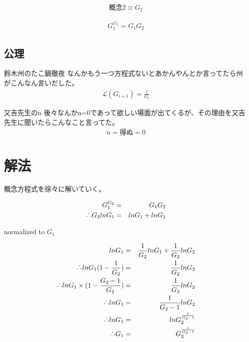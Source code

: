 \begin{eqnarray}
{概念2}\equiv G_{2}
\end{eqnarray}

\begin{eqnarray}
G_{1}^{G_{2}}=G_{1}G_{2}
\end{eqnarray}

\subsection{公理}
\begin{itembox}[c]{鈴木州のたこ鍋徹夜}
なんかもう一つ方程式ないとあかんやんとか言ってたら州がこんなん言いだした。
\begin{eqnarray}
\mathcal{L}(G_{i+1})=\frac{1}{G_{i}}
\end{eqnarray}
\end{itembox}

\begin{itembox}[c]{又吉先生のn}
後々なんかn=0であって欲しい場面が出てくるが、その理由を又吉先生に聞いたらこんなこと言ってた。
\begin{eqnarray}
n = 得ぬ = 0
\end{eqnarray}
\end{itembox}

\section{解法}
概念方程式を徐々に解いていく。

\begin{eqnarray}
G_{1}^{G_{2}}&=&G_{1}G_{2}\\
\raisebox{.2ex}{.}\raisebox{1.2ex}{.}\raisebox{.2ex}{.}  G_{2}ln{G_{1}}&=&ln{G_{1}}+ln{G_{2}}\\
\end{eqnarray}

normalized to $G_{1}$

\begin{eqnarray}
ln{G_{1}}&=&\frac{1}{G_{2}}ln{G_{1}}+\frac{1}{G_{2}}ln{G_{2}}\\
\raisebox{.2ex}{.}\raisebox{1.2ex}{.}\raisebox{.2ex}{.} ln{G_{1}}(1-\frac{1}{G_{2}})&=&\frac{1}{G_{2}}ln{G_{2}}\\
\raisebox{.2ex}{.}\raisebox{1.2ex}{.}\raisebox{.2ex}{.} ln{G_{1}}\times (1-\frac{G_{2}-1}{G_{2}})&=&\frac{1}{G_{2}}ln{G_{2}}\\
\raisebox{.2ex}{.}\raisebox{1.2ex}{.}\raisebox{.2ex}{.} ln{G_{1}}&=&\frac{1}{G_{2}-1}ln{G_{2}}\\
\raisebox{.2ex}{.}\raisebox{1.2ex}{.}\raisebox{.2ex}{.} ln{G_{1}}&=&ln{G_{2}^{\frac{1}{G_{2}-1}}}\\
\raisebox{.2ex}{.}\raisebox{1.2ex}{.}\raisebox{.2ex}{.} G_{1}&=&G_{2}^{\frac{1}{G_{2}-1}}
 \end{eqnarray}

